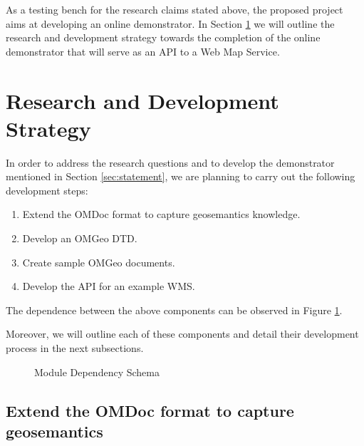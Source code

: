 \documentclass[a4paper,11pt,openany,notitlepage]{article}
\begin{document}
As a testing bench for the research claims stated above, the proposed project aims at developing an online demonstrator. In Section \ref{sec:strategy} we will outline the research and development strategy towards the completion of the online demonstrator that will serve as an API to a Web Map Service.

%
\section{Research and Development Strategy} \label{sec:strategy}
\indent

In order to address the research questions and to develop the demonstrator mentioned in Section \ref{sec:statement}, we are planning to carry out the following development steps:
\begin{enumerate}
	\item Extend the OMDoc format to capture geosemantics knowledge.
	\item Develop an OMGeo DTD.
	\item Create sample OMGeo documents.
	\item Develop the API for an example WMS.
\end{enumerate}
The dependence between the above components can be observed in Figure \ref{fig:umlschema}.

Moreover, we will outline each of these components and detail their development process in the next subsections.
\begin{figure}[h]
	\centering		
		\caption{Module Dependency Schema}
	\label{fig:umlschema}
\end{figure}

\subsection{Extend the OMDoc format to capture geosemantics} \label{subsec:extension}
\indent
\end{document}
